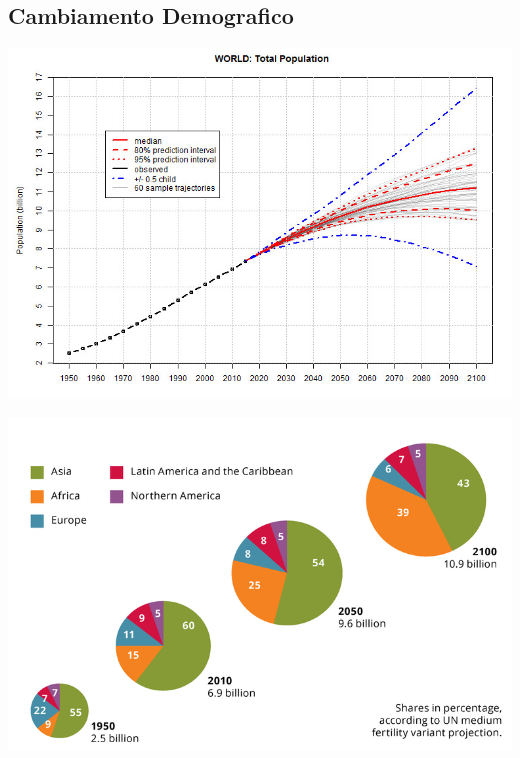 \documentclass[a4paper,12pt, oneside]{book}
\begin{document}
    \subsection{Cambiamento Demografico}
    \begin{center}
      \begin{minipage}{0.48\linewidth}
    	\includegraphics[width=\linewidth]{"Immagini/future-timeline-2050-2100"}
    	\label{fig:populationgrowth}
      \end{minipage}%
      \hfill
      \begin{minipage}{0.46\linewidth}
      \includegraphics[width=\linewidth]{"Immagini/countries_growth_1950_2100"}
      \label{fig:countriesgrowth}
      \end{minipage}
    \end{center}
\end{document}
